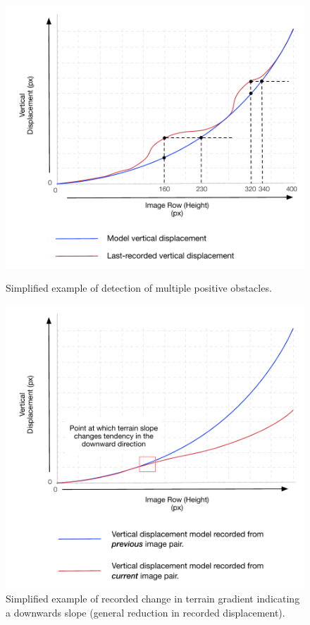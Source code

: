 \begin{figure}[htbp]
\begin{minipage}[b]{0.5\linewidth}
\centering
\includegraphics[width=\linewidth]{images/multi_obstacle_graph.pdf}
\caption{Simplified example of detection of multiple positive obstacles.}
\label{fig:multi_obstacle}
\end{minipage}
\hspace{0.5cm}
\begin{minipage}[b]{0.5\linewidth}
\centering
\includegraphics[width=0.9\linewidth]{images/gradient_graph.pdf}
\caption{Simplified example of recorded change in terrain gradient indicating a downwards slope (general reduction in recorded displacement).}
\label{fig:gradient}
\end{minipage}
\end{figure}
 
